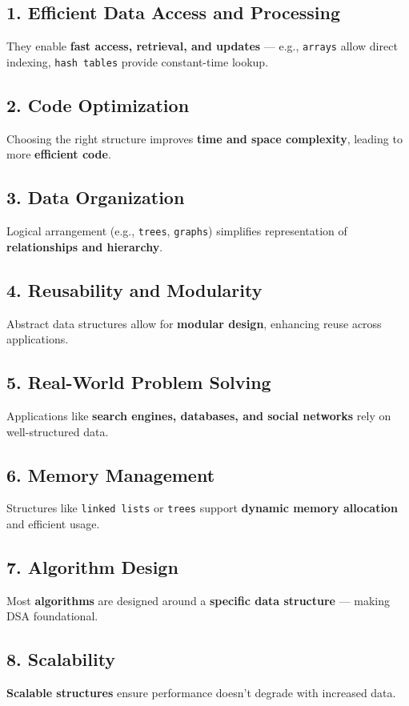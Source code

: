 \subsection*{\textbf{1. Efficient Data Access and Processing}}
They enable \textbf{fast access, retrieval, and updates} — e.g., \texttt{arrays} allow direct indexing, \texttt{hash tables} provide constant-time lookup.

\subsection*{\textbf{2. Code Optimization}}
Choosing the right structure improves \textbf{time and space complexity}, leading to more \textbf{efficient code}.

\subsection*{\textbf{3. Data Organization}}
Logical arrangement (e.g., \texttt{trees}, \texttt{graphs}) simplifies representation of \textbf{relationships and hierarchy}.

\subsection*{\textbf{4. Reusability and Modularity}}
Abstract data structures allow for \textbf{modular design}, enhancing reuse across applications.

\subsection*{\textbf{5. Real-World Problem Solving}}
Applications like \textbf{search engines, databases, and social networks} rely on well-structured data.

\subsection*{\textbf{6. Memory Management}}
Structures like \texttt{linked lists} or \texttt{trees} support \textbf{dynamic memory allocation} and efficient usage.

\subsection*{\textbf{7. Algorithm Design}}
Most \textbf{algorithms} are designed around a \textbf{specific data structure} — making DSA foundational.

\subsection*{\textbf{8. Scalability}}
\textbf{Scalable structures} ensure performance doesn’t degrade with increased data.

